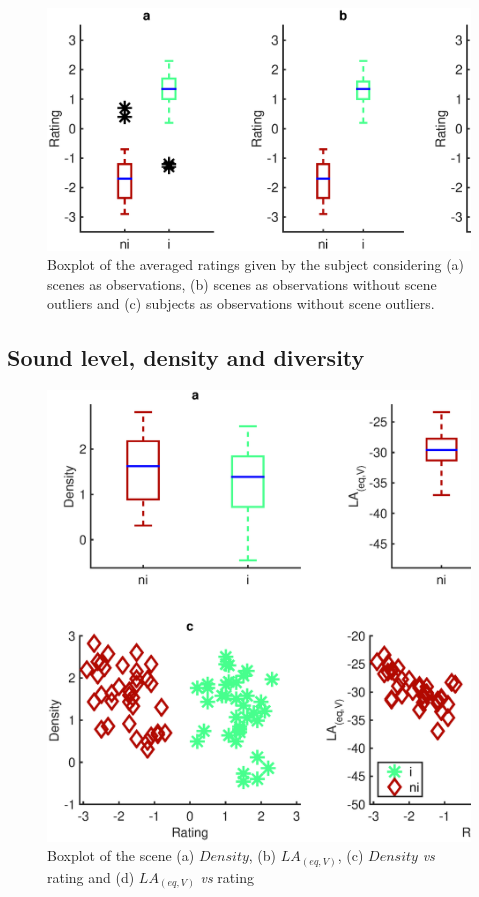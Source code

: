 \documentclass[twoside,twocolumn]{article}
\begin{document}
\begin{figure}[t]
\begin{center}
\includegraphics[width=.4\paperwidth]{../gfxMatlab/xp2_1.eps}
\caption{\label{xp2_1} Boxplot of the averaged ratings given by the subject considering (a) scenes as observations, (b) scenes as observations without scene outliers and (c) subjects as observations without scene outliers.} 
\end{center}
\end{figure}


\subsection{Sound level, density and diversity}
\label{sec:levelDensityDiversity}

\begin{figure}[t!]
\centering
\includegraphics[width=.4\paperwidth]{../gfxMatlab/xp1_deSoLv_1.eps} 
\caption{\label{fig:xp1_deSoLv_1}  Boxplot of  the scene (a) $Density$, (b) $LA_{(eq,V)}$, (c) $Density$ \emph{vs} rating and (d) $LA_{(eq,V)}$ \emph{vs} rating}
\end{figure}
\end{document}
